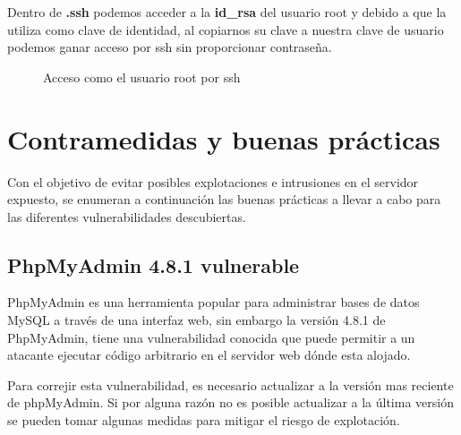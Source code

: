 \documentclass[a4paper]{article}
\begin{document}
Dentro de \textbf{.ssh} podemos acceder a la \textbf{id\_rsa} del usuario root y
debido a que la utiliza como clave de identidad, al copiarnos su clave a nuestra
clave de usuario podemos ganar acceso por ssh sin proporcionar contraseña.
\vspace{0.4cm}
\begin{figure}[H]
  \centering
  \setlength{\fboxrule}{0.8pt}
  \caption{Acceso como el usuario root por ssh}
\end{figure}
\vspace{0.4cm}

\clearpage


\section{Contramedidas y buenas prácticas}
Con el objetivo de evitar posibles explotaciones e intrusiones en el servidor expuesto, se enumeran a continuación las
buenas prácticas a llevar a cabo para las diferentes vulnerabilidades descubiertas.


\subsection{PhpMyAdmin 4.8.1 vulnerable}

PhpMyAdmin es una herramienta popular para administrar bases de datos MySQL a través de una interfaz web, 
sin embargo la versión 4.8.1 de PhpMyAdmin, tiene una vulnerabilidad conocida que puede permitir a un atacante
ejecutar código arbitrario en el servidor web dónde esta alojado.

Para correjir esta vulnerabilidad, es necesario actualizar a la versión mas reciente de phpMyAdmin.
Si por alguna razón no es posible actualizar a la última versión se pueden tomar algunas medidas para mitigar
el riesgo de explotación.
\end{document}
